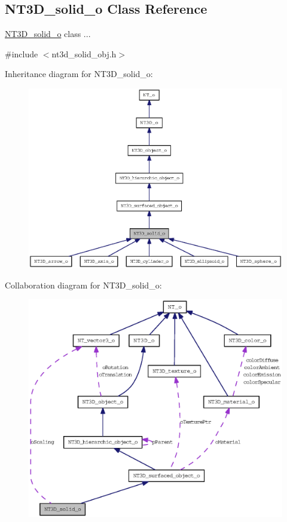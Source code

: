 \subsection{NT3D\_\-solid\_\-o Class Reference}
\label{class_n_t3_d__solid__o}


\hyperlink{class_n_t3_d__solid__o}{NT3D\_\-solid\_\-o} class ...  




{\ttfamily \#include $<$nt3d\_\-solid\_\-obj.h$>$}



Inheritance diagram for NT3D\_\-solid\_\-o:
\nopagebreak
\begin{figure}[H]
\begin{center}
\leavevmode
\includegraphics[width=400pt]{class_n_t3_d__solid__o__inherit__graph}
\end{center}
\end{figure}


Collaboration diagram for NT3D\_\-solid\_\-o:
\nopagebreak
\begin{figure}[H]
\begin{center}
\leavevmode
\includegraphics[width=400pt]{class_n_t3_d__solid__o__coll__graph}
\end{center}
\end{figure}

